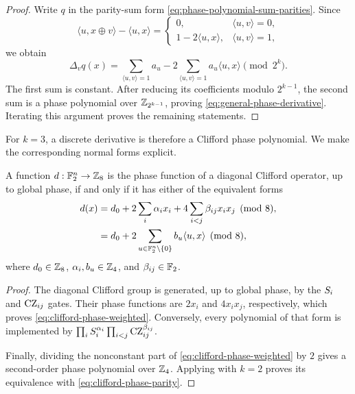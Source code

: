 \begin{proof}
    Write $q$ in the parity-sum form
    \eqref{eq:phase-polynomial-sum-parities}.  Since
    \[
        \langle u,x\oplus v\rangle-\langle u,x\rangle
        =\begin{cases}
            0, & \langle u,v\rangle=0,\\
            1-2\langle u,x\rangle, & \langle u,v\rangle=1,
        \end{cases}
    \]
    we obtain
    \begin{equation}
        \label{eq:derivative-parity-form}
        \Delta_vq(x)
        =\sum_{\langle u,v\rangle=1}a_u
        -2\sum_{\langle u,v\rangle=1}a_u\langle u,x\rangle
        \pmod {2^k}.
    \end{equation}
    The first sum is constant.  After reducing its coefficients modulo
    $2^{k-1}$, the second sum is a phase polynomial over
    \(\Z_{2^{k-1}}\), proving \cref{eq:general-phase-derivative}.
    Iterating this argument proves the remaining statements.
\end{proof}

For $k=3$, a discrete derivative is therefore a Clifford phase polynomial.
We make the corresponding normal forms explicit.

\begin{theorem}
    \label{thm:clifford-phase-polynomial}
    A function $d:\F_2^n\to\Z_8$ is the phase function of a diagonal
    Clifford operator, up to global phase, if and only if it has either of
    the equivalent forms
    \begin{align}
        d(x)
        &=d_0+2\sum_i \alpha_i x_i
          +4\sum_{i<j}\beta_{ij}x_ix_j \pmod 8,
          \label{eq:clifford-phase-weighted}\\
        &=d_0+2\sum_{u\in\F_2^n\setminus\{0\}}
          b_u\langle u,x\rangle \pmod 8,
          \label{eq:clifford-phase-parity}
    \end{align}
    where \(d_0\in\Z_8\), \(\alpha_i,b_u\in\Z_4\), and
    \(\beta_{ij}\in\F_2\).
\end{theorem}

\begin{proof}
    The diagonal Clifford group is generated, up to global phase, by the
    $\S_i$ and \(\CZ_{ij}\) gates.  Their phase functions are $2x_i$ and
    $4x_ix_j$, respectively, which proves
    \eqref{eq:clifford-phase-weighted}.  Conversely, every polynomial of
    that form is implemented by
    \(\prod_i \S_i^{\alpha_i}\prod_{i<j}\CZ_{ij}^{\beta_{ij}}\).

    Finally, dividing the nonconstant part of
    \eqref{eq:clifford-phase-weighted} by $2$ gives a second-order phase
    polynomial over \(\Z_4\).  Applying
     with $k=2$ proves its
    equivalence with \eqref{eq:clifford-phase-parity}.
\end{proof}

